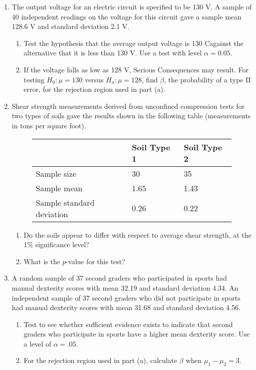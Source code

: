 \documentclass[12pt]{article}
\begin{document}
\begin{enumerate}
\item The output voltage for an electric circuit is specified to be 130 V. A sample of 40 independent readings on the voltage for this circuit gave a sample mean 128.6 V and standard deviation 2.1 V. 
\begin{enumerate}
\item Test the hypothesis that the average output voltage is 130 Cagainst the alternative that it is less than 130 V. Use a test with level $\alpha = 0.05$.
\item If the voltage falls as low as 128 V, Serious Consequences may result. For testing $H_0: \mu = 130$ versus $H_a: \mu = 128$, find $\beta$, the probability of a type II error, for the rejection region used in part (a).
\end{enumerate}

\item Shear strength measurements derived from unconfined compression tests for two types of soils gave the results shown in the following table (measurements in tons per square foot). 
\begin{figure}[H]
\centering
\begin{tabular}{l@{\hskip 2cm}l@{\hskip 2cm}l}
\toprule
& Soil Type 1 & Soil Type 2\\
\midrule
Sample size & 30 & 35 \\
Sample mean & 1.65 & 1.43 \\
Sample standard deviation & 0.26 & 0.22 \\
\bottomrule
\end{tabular}
\end{figure} 

\begin{enumerate}
\item Do the soils appear to differ with respect to average shear strength, at the 1\% significance level?
\item What is the $p$-value for this test?
\end{enumerate}

\item A random sample of 37 second graders who participated in sports had manual dexterity scores with mean 32.19 and standard deviation 4.34. An independent sample of 37 second graders who did not participate in sports had manual dexterity scores with mean 31.68 and standard deviation 4.56.
\begin{enumerate}
\item Test to see whether sufficient evidence exists to indicate that second graders who participate in sports have a higher mean dexterity score. Use a level of $\alpha = .05$.
\item For the rejection region used in part (a), calculate $\beta$ when $\mu_1 − \mu_2 = 3$.
\end{enumerate}


\end{enumerate}
\end{document}
